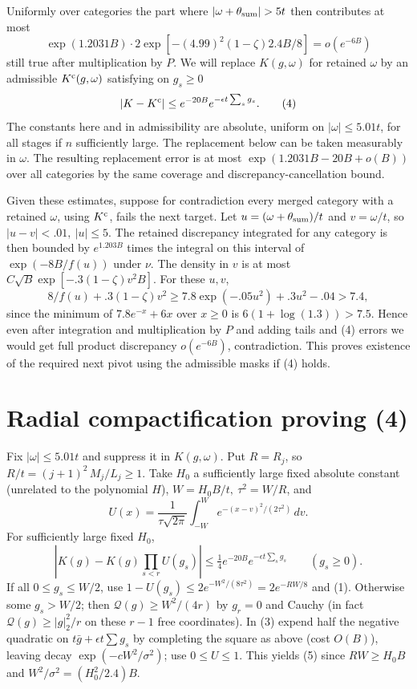 \documentclass[11pt]{article}
\begin{document}
Uniformly over categories the part where \(|\omega+\theta_{\rm sum}|>5t\) then contributes at most
\[
 \exp(1.2031B)\cdot 2\exp[-(4.99)^2(1-\zeta)2.4 B/8] = o(e^{-6 B})
\]
still true after multiplication by \(P\). We will replace \(K(g,\omega)\) for retained \(\omega\) by an admissible \(K^{\rm c}(g,\omega)\) satisfying on \(g_s\ge0\)
\[
 |K-K^{\rm c}|\le e^{-20 B} e^{-\epsilon t \sum_s g_s}.
 \tag{4}
\]
The constants here and in admissibility are absolute, uniform on \(|\omega|\le5.01t\), for all stages if \(n\) sufficiently large. The replacement below can be taken measurably in \(\omega\). The resulting replacement error is at most \(\exp(1.2031B-20 B+o(B))\) over all categories by the same coverage and discrepancy-cancellation bound.

Given these estimates, suppose for contradiction every merged category with a retained \(\omega\), using \(K^{\rm c}\), fails the next target. Let \(u=(\omega+\theta_{\rm sum})/t\) and \(v=\omega/t\), so \(|u-v|<.01,\ |u|\le5\). The retained discrepancy integrated for any category is then bounded by \(e^{1.203 B}\) times the integral on this interval of \(\exp(-8 B / f(u))\) under \(\nu\). The density in \(v\) is at most \(C\sqrt{B}\exp[-.3(1-\zeta)v^2 B]\). For these \(u,v\),
\[
 8/f(u)+.3(1-\zeta)v^2
 \ge 7.8\exp(-.05 u^2)+.3u^2-.04 > 7.4 ,
\]
since the minimum of \(7.8e^{-x}+6x\) over \(x\ge0\) is \(6(1+\log(1.3))>7.5\). Hence even after integration and multiplication by \(P\) and adding tails and (4) errors we would get full product discrepancy \(o(e^{-6B})\), contradiction. This proves existence of the required next pivot using the admissible masks if (4) holds.

\section*{Radial compactification proving (4)} Fix \(|\omega|\le 5.01t\) and suppress it in \(K(g,\omega)\). Put \(R=R_j\), so \(R/t=(j+1)^2\,M_j/L_j\ge1\). Take \(H_0\) a sufficiently large fixed absolute constant (unrelated to the polynomial \(H\)), \(W=H_0 B/t,\ \tau^2=W/R\), and
\[
 U(x)=\frac1{\tau\sqrt{2\pi}}\int_{-W}^W e^{-(x-v)^2/(2\tau^2)}\,dv .
\]
For sufficiently large fixed \(H_0\),
\[
 \left|K(g)-K(g)\prod_{s<r}U(g_s)\right|
 \le \tfrac14 e^{-20 B} e^{-\epsilon t\sum_s g_s}\qquad(g_s\ge0).
 \tag{5}
\]
If all \(0\le g_s\le W/2\), use \(1-U(g_s)\le 2e^{-W^2/(8\tau^2)}=2e^{-RW/8}\) and (1). Otherwise some \(g_s>W/2\); then \(\mathcal{Q}(g)\ge W^2/(4r)\) by \(g_r=0\) and Cauchy (in fact \(\mathcal{Q}(g)\ge |g|_2^2/r\) on these \(r-1\) free coordinates). In (3) expend half the negative quadratic on \(t\bar g+\epsilon t\sum g_s\) by completing the square as above (cost \(O(B)\)), leaving decay \(\exp(-c W^2/\sigma^2)\); use \(0\le U\le1\). This yields (5) since \(R W\ge H_0 B\) and \(W^2/\sigma^2=(H_0^2/2.4) B\).
\end{document}
